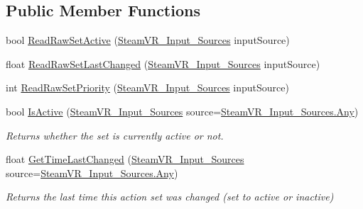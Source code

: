 \subsection*{Public Member Functions}
\begin{DoxyCompactItemize}
\item 
bool \mbox{\hyperlink{interface_valve_1_1_v_r_1_1_i_steam_v_r___action_set_a7db619853c00ffb7ac16ba370921ac4e}{Read\+Raw\+Set\+Active}} (\mbox{\hyperlink{namespace_valve_1_1_v_r_a82e5bf501cc3aa155444ee3f0662853f}{Steam\+V\+R\+\_\+\+Input\+\_\+\+Sources}} input\+Source)
\item 
float \mbox{\hyperlink{interface_valve_1_1_v_r_1_1_i_steam_v_r___action_set_a7647555ffdd2708516296e140100a8ae}{Read\+Raw\+Set\+Last\+Changed}} (\mbox{\hyperlink{namespace_valve_1_1_v_r_a82e5bf501cc3aa155444ee3f0662853f}{Steam\+V\+R\+\_\+\+Input\+\_\+\+Sources}} input\+Source)
\item 
int \mbox{\hyperlink{interface_valve_1_1_v_r_1_1_i_steam_v_r___action_set_a79f6520e36cd4bfa4ddb1388a8ff1b51}{Read\+Raw\+Set\+Priority}} (\mbox{\hyperlink{namespace_valve_1_1_v_r_a82e5bf501cc3aa155444ee3f0662853f}{Steam\+V\+R\+\_\+\+Input\+\_\+\+Sources}} input\+Source)
\item 
bool \mbox{\hyperlink{interface_valve_1_1_v_r_1_1_i_steam_v_r___action_set_aa56bf951c356649897b7ebf385ff4804}{Is\+Active}} (\mbox{\hyperlink{namespace_valve_1_1_v_r_a82e5bf501cc3aa155444ee3f0662853f}{Steam\+V\+R\+\_\+\+Input\+\_\+\+Sources}} source=\mbox{\hyperlink{namespace_valve_1_1_v_r_a82e5bf501cc3aa155444ee3f0662853faed36a1ef76a59ee3f15180e0441188ad}{Steam\+V\+R\+\_\+\+Input\+\_\+\+Sources.\+Any}})
\begin{DoxyCompactList}\small\item\em Returns whether the set is currently active or not. \end{DoxyCompactList}\item 
float \mbox{\hyperlink{interface_valve_1_1_v_r_1_1_i_steam_v_r___action_set_a7c8434a48c12c5b70f6cbfd1f2bca5be}{Get\+Time\+Last\+Changed}} (\mbox{\hyperlink{namespace_valve_1_1_v_r_a82e5bf501cc3aa155444ee3f0662853f}{Steam\+V\+R\+\_\+\+Input\+\_\+\+Sources}} source=\mbox{\hyperlink{namespace_valve_1_1_v_r_a82e5bf501cc3aa155444ee3f0662853faed36a1ef76a59ee3f15180e0441188ad}{Steam\+V\+R\+\_\+\+Input\+\_\+\+Sources.\+Any}})
\begin{DoxyCompactList}\small\item\em Returns the last time this action set was changed (set to active or inactive) \end{DoxyCompactList}\item 

\end{DoxyCompactItemize}
